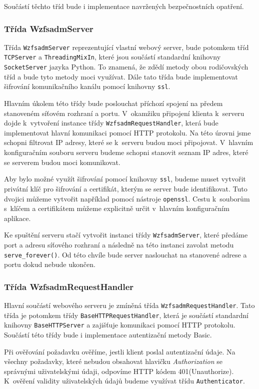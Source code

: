     Součástí těchto tříd bude i implementace navržených bezpečnostních opatření.
    \subsubsection{Třída WzfsadmServer}
    Třída \verb|WzfsadmServer| reprezentující vlastní webový server, bude potomkem tříd \verb|TCPServer| a \verb|ThreadingMixIn|, které jsou součástí standardní knihovny \verb|SocketServer| \cite{socketserver} jazyka Python. To znamená, že zdědí metody obou rodičovských tříd a bude tyto metody moci využívat. Dále tato třída bude implementovat šifrování komunikačního kanálu pomocí knihovny \verb|ssl|.

    Hlavním úkolem této třídy bude poslouchat příchozí spojení na předem stanoveném síťovém rozhraní a portu. V~okamžiku připojení klienta k~serveru dojde k~vytvoření instance třídy \verb|WzfsadmRequestHandler|, která bude implementovat hlavní komunikaci pomocí HTTP protokolu. Na této úrovni jsme schopni filtrovat IP adresy, které se k~serveru budou moci připojovat. V~hlavním konfiguračním souboru serveru budeme schopni stanovit seznam IP adres, které se serverem budou moci komunikovat.

    Aby bylo možné využít šifrování pomocí knihovny \verb|ssl|, budeme muset vytvořit privátní klíč pro šifrování a certifikát, kterým se server bude identifikovat. Tuto dvojici můžeme vytvořit například pomocí nástroje \verb|openssl|. Cestu k~souborům s~klíčem a certifikátem můžeme explicitně určit v~hlavním konfiguračním aplikace.

    Ke spuštění serveru stačí vytvořit instanci třídy \verb|WzfsadmServer|, které předáme port a adresu síťového rozhraní a následně na této instanci zavolat metodu \verb|serve_forever()|. Od této chvíle bude server naslouchat na stanovené adrese a portu dokud nebude ukončen.

    \subsubsection{Třída WzfsadmRequestHandler}
    Hlavní součástí webového serveru je zmíněná třída \verb|WzfsadmRequestHandler|. Tato třída je potomkem třídy \verb|BaseHTTPRequestHandler|, která je součástí standardní knihovny \verb|BaseHTTPServer| a zajišťuje komunikaci pomocí HTTP protokolu. Součástí této třídy bude i implementace autentizační metody Basic.

    Při ověřování požadavku ověříme, jestli klient poslal autentizační údaje. Na všechny požadavky, které nebudou obsahovat hlavičku \emph{Authorization} se správnými uživatelskými údaji, odpovíme HTTP kódem 401(Unauthorize).
    K~ověření validity uživatelských údajů budeme využívat třídu \verb|Authenticator|.

